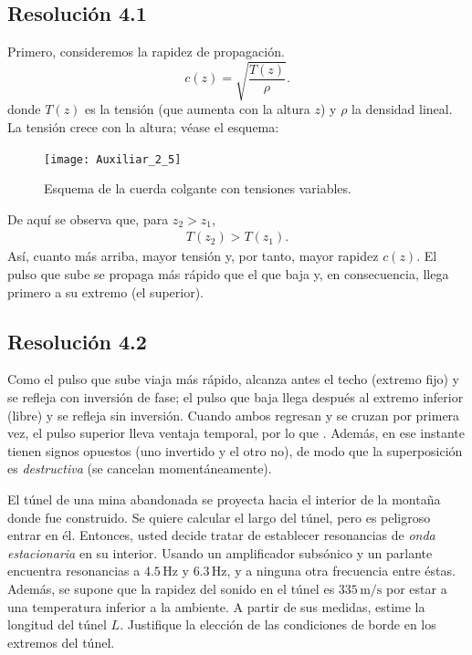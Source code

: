 \documentclass[
  11pt,
  letterpaper,
   addpoints,
   answers
  ]{exam}
\begin{document}
\begin{questions}
\begin{solution}
\subsection*{Resolución 4.1}
Primero, consideremos la rapidez de propagación.
\begin{equation}
  c(z)=\sqrt{\frac{T(z)}{\rho}}.
\end{equation}
donde $T(z)$ es la tensión (que aumenta con la altura $z$) y $\rho$ la densidad lineal. La tensión crece con la altura; véase el esquema:
\begin{figure}[H]
  \centering
  \texttt{[image: Auxiliar\_2\_5]}
  \caption{Esquema de la cuerda colgante con tensiones variables.}
  \label{fig:esquema-tension}
\end{figure}
De aquí se observa que, para $z_2>z_1$,
\begin{align}
  T(z_{2}) > T(z_{1}).
\end{align}
Así, cuanto más arriba, mayor tensión y, por tanto, mayor rapidez $c(z)$. El pulso que sube se propaga más rápido que el que baja y, en consecuencia, llega primero a su extremo (el superior).

\subsection*{Resolución 4.2}
Como el pulso que sube viaja más rápido, alcanza antes el techo (extremo fijo) y se refleja con inversión de fase; el pulso que baja llega después al extremo inferior (libre) y se refleja sin inversión. Cuando ambos regresan y se cruzan por primera vez, el pulso superior lleva ventaja temporal, por lo que
. Además, en ese instante tienen signos opuestos (uno invertido y el otro no), de modo que la superposición es \emph{destructiva} (se cancelan momentáneamente).
\end{solution}
\question El túnel de una mina abandonada se proyecta hacia el interior de la montaña donde fue construido. Se quiere calcular el largo del túnel, pero es peligroso entrar en él. Entonces, usted decide tratar de establecer resonancias de \emph{onda estacionaria} en su interior. Usando un amplificador subsónico y un parlante encuentra resonancias a \(4.5\,\text{Hz}\) y \(6.3\,\text{Hz}\), y a ninguna otra frecuencia entre éstas. Además, se supone que la rapidez del sonido en el túnel es \(335\,\text{m/s}\) por estar a una temperatura inferior a la ambiente. A partir de sus medidas, estime la longitud del túnel \(L\). Justifique la elección de las condiciones de borde en los extremos del túnel.
\begin{solution}


\end{solution}
\end{questions}
\end{document}
